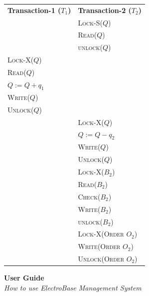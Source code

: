 \documentclass[12pt]{report}
\begin{document}
    \begin{center}
        \begin{adjustbox}{width=\textwidth}
            \begin{tabularx}{\textwidth}{|X|X|}
            \hline
            \multirow{2}{*}{\textbf{Transaction-1 ($T_{1}$)}} & \multirow{2}{*}{\textbf{Transaction-2 ($T_{2}$)}} \\
            & \\ \hline
            & \textsc{Lock-S($Q$)} \\
            & \textsc{Read($Q$)} \\
            & \textsc{unlock($Q$)} \\
            \textsc{Lock-X($Q$)} & \\
            \textsc{Read($Q$)} & \\
            \textsc{$Q := Q + q_{1}$} & \\
            \textsc{Write($Q$)} & \\
            \textsc{Unlock($Q$)} & \\
            & \textsc{Lock-X($Q$)} \\
            & \textsc{$Q := Q - q_{2}$} \\
            & \textsc{Write($Q$)} \\
            & \textsc{Unlock($Q$)} \\
            & \textsc{Lock-X($B_{2}$)} \\
            & \textsc{Read($B_{2}$)} \\
            & \textsc{Check($B_{2}$)} \\
            & \textsc{Write($B_{2}$)} \\
            & \textsc{unlock($B_{2}$)} \\
            & \textsc{Lock-X(Order $O_{2}$)} \\
            & \textsc{Write(Order $O_{2}$)} \\
            & \textsc{Unlock(Order $O_{2}$)} \\
            \hline
            \end{tabularx}
        \end{adjustbox}
    \end{center}

    \vfill \pagebreak
    \hspace{0pt}
    \vfill
    \begin{center}
        \Huge \textbf{User Guide} \\
        \vspace*{5pt}
        \Large \textit{How to use ElectroBase Management System}
    \end{center}
    \vfill
    \pagebreak
\end{document}
